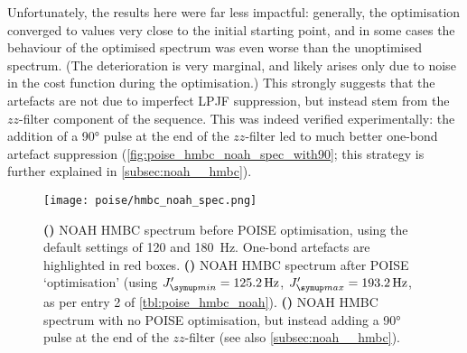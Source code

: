 Unfortunately, the results here were far less impactful: generally, the optimisation converged to values very close to the initial starting point, and in some cases the behaviour of the optimised spectrum was even worse than the unoptimised spectrum.
(The deterioration is very marginal, and likely arises only due to noise in the cost function during the optimisation.)
This strongly suggests that the artefacts are not due to imperfect LPJF suppression, but instead stem from the $zz$-filter component of the sequence.
This was indeed verified experimentally: the addition of a \carbon{} \ang{90} pulse at the end of the $zz$-filter led to much better one-bond artefact suppression (\cref{fig:poise_hmbc_noah_spec_with90}; this strategy is further explained in \cref{subsec:noah__hmbc}).

\begin{figure}[htb]
    \centering
    \texttt{[image: poise/hmbc\_noah\_spec.png]}%
    {\label{fig:poise_hmbc_noah_spec_unopt}}%
    {\label{fig:poise_hmbc_noah_spec_opt}}%
    {\label{fig:poise_hmbc_noah_spec_with90}}%
    \caption[NOAH HMBC spectra before and after optimisation]{
        \textbf{()} NOAH HMBC spectrum before POISE optimisation, using the default settings of 120 and \qty{180}{\Hz}.
        One-bond artefacts are highlighted in red boxes.
        \textbf{()} NOAH HMBC spectrum after POISE `optimisation' (using $\Jmin' = \qty{125.2}{\Hz}$, $\Jmax' = \qty{193.2}{\Hz}$, as per entry 2 of \cref{tbl:poise_hmbc_noah}).
        \textbf{()} NOAH HMBC spectrum with no POISE optimisation, but instead adding a \ang{90} \carbon{} pulse at the end of the $zz$-filter (see also \cref{subsec:noah__hmbc}).
    }
    \label{fig:poise_hmbc_noah_spec}
\end{figure}
